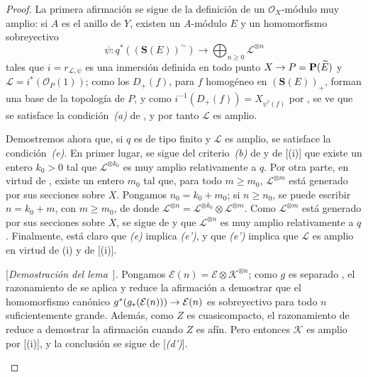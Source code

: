 \documentclass[oneside,10pt]{amsart}
\makeatletter
\renewcommand{\geq}{\geqslant}
\newcommand{\ega@arrow}[2]{\mathchoice{#1}{#2}{#2}{#2}}
\renewcommand{\to}{\ega@arrow{\longrightarrow}{\rightarrow}}
\newcommand{\oldpage}[2][]{\marginnote{\normalfont\footnotesize\textbf{#1}~|~#2}\ignorespaces}
\let\EGAOriginalLabel\label
\renewcommand{\label}[1]{\phantomsection\EGAOriginalLabel{#1}}
\makeatother
\begin{document}
\begin{proof}
La primera afirmación se sigue de la definición  de un $\mathcal{O}_X$-módulo muy amplio:
si $A$ es el anillo de $Y$, existen un $A$-módulo $E$ y un homomorfismo sobreyectivo
\[
  \psi:q^*((\mathbf{S}(E))^{\sim})\longrightarrow
  \bigoplus_{n\geq0}\mathcal{L}^{\otimes n}
\]
tales que $i=r_{\mathcal{L},\psi}$ es una inmersión definida en todo punto $X\to P=\mathbf{P}(\widetilde{E})$ y $\mathcal{L}=i^*(\mathcal{O}_P(1))$;
como los $D_+(f)$, para $f$ homogéneo en $(\mathbf{S}(E))_+$, forman una base de la topología de $P$, y como $i^{-1}(D_+(f))=X_{\psi^\flat(f)}$ por , se ve que se satisface la condición~\emph{(a)} de , y por tanto $\mathcal{L}$ es amplio.

Demostremos ahora que, si $q$ es de tipo finito y $\mathcal{L}$ es amplio, se satisface la condición~\emph{(e)}.
En primer lugar, se sigue del criterio~\emph{(b)} de  y de [(i)] que existe
\oldpage[II]{87}
un entero $k_0>0$ tal que $\mathcal{L}^{\otimes k_0}$ es muy amplio relativamente a $q$.
Por otra parte, en virtud de , existe un entero $m_0$ tal que, para todo $m\geq m_0$, $\mathcal{L}^{\otimes m}$ está generado por sus secciones sobre $X$.
Pongamos $n_0=k_0+m_0$;
si $n\geq n_0$, se puede escribir $n=k_0+m$, con $m\geq m_0$, de donde $\mathcal{L}^{\otimes n}
=\mathcal{L}^{\otimes k_0}\otimes\mathcal{L}^{\otimes m}$.
Como $\mathcal{L}^{\otimes m}$ está generado por sus secciones sobre $X$, se sigue de  y  que $\mathcal{L}^{\otimes n}$ es muy amplio relativamente a $q$.
Finalmente, está claro que \emph{(e)} implica \emph{(e')}, y que \emph{(e')} implica que $\mathcal{L}$ es amplio en virtud de (i) y de [(i)].

  \begin{env}[4.5.10.1]
  \label{II.4.5.10.1-fr}
  [\emph{Demostración del lema}~].
  Pongamos $\mathcal{E}(n)=\mathcal{E}\otimes\mathcal{K}^{\otimes n}$;
  como $g$ es separado , el razonamiento de  se aplica y reduce la afirmación a demostrar que el homomorfismo canónico $g^*(g_*(\mathcal{E}(n)))\to\mathcal{E}(n)$ es sobreyectivo para todo $n$ suficientemente grande.
  Además, como $Z$ es cuasicompacto, el razonamiento de  reduce a demostrar la afirmación cuando $Z$ es afín.
  Pero entonces $\mathcal{K}$ es amplio por [(i)], y la conclusión se sigue de [\emph{(d')}].
  \end{env}
\end{proof}
\end{document}

